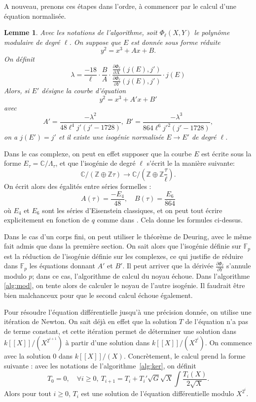 \documentclass[11pt,a4paper]{article}
\newcommand{\Z}{\mathbb{Z}}
\newcommand{\C}{\mathbb{C}}
\newcommand{\F}{\mathbb{F}}
\newcommand{\vers}{\longrightarrow}
\renewcommand{\v}{\vspace{5mm}}
\newtheorem*{lem}{Lemme}
\theoremstyle{definition}
\begin{document}
A nouveau, prenons ces étapes dans l'ordre, à commencer par le calcul d'une équation normalisée.

\begin{lem}
Avec les notations de l'algorithme, soit $\Phi_ \ell(X, Y)$ le polynôme modulaire de degré $\ell$. On suppose que $E$ est donnée sous forme réduite
$$y^2 = x^3 + A x + B.$$
On définit
$$\lambda = \frac{-18}{\ell}\cdot\frac{B}{A}\cdot\frac{\frac{\partial \Phi_\ell}{\partial X} (j(E), j')}{\frac{\partial \Phi_\ell}{\partial Y} (j(E), j')} \cdot j(E) $$
Alors, si $E'$ désigne la courbe d'équation
$$y^2 = x^3 + A' x + B' $$
avec
$$A' = \frac{-\lambda^2}{48 \ell^4 j' (j' - 1728)},\ B' = \frac{-\lambda^3}{864 \ell^6 j'^2(j'-1728)},$$
on a $j(E') = j'$ et il existe une isogénie normalisée $E\vers E'$ de degré $\ell$.
\end{lem}

Dans le cas complexe, on peut en effet supposer que la courbe $E$ est écrite sous la forme $E_\tau = \C/\Lambda_\tau$, et que l'isogénie de degré $\ell$ s'écrit le la manière suivante:
$$\C/(\Z\oplus \Z\tau) \vers \C/(\Z \oplus \Z\frac{\tau}{\ell}).$$
 On écrit alors des égalités entre séries formelles :
$$A(\tau) = \frac{- E_4}{48}, \quad B(\tau) = \frac{E_6}{864}$$
où $E_4$ et $E_6$ sont les séries d'Eisenstein classiques, et on peut tout écrire explicitement en fonction de $q$ comme dans \cite{Schoof}. Cela donne les formules ci-dessus.

Dans le cas d'un corps fini, on peut utiliser le théorème de Deuring, avec le même fait admis que dans la première section. On sait alors que l'isogénie définie sur $\F_p$ est la réduction de l'isogénie définie sur les complexes, ce qui justifie de réduire dans $\F_p$ les équations donnant $A'$ et $B'$. Il peut arriver que la dérivée $\frac{\partial \Phi_\ell}{\partial Y}$ s'annule modulo $p$; dans ce cas, l'algorithme de calcul du noyau échoue. Dans l'algorithme \ref{alg:mod}, on tente alors de calculer le noyau de l'autre isogénie. Il faudrait être bien malchanceux pour que le second calcul échoue également.

\v

Pour résoudre l'équation différentielle jusqu'à une précision donnée, on utilise une itération de Newton. On sait déjà en effet que la solution $T$ de l'équation n'a pas de terme constant, et cette itération permet de déterminer une solution dans $k[[X]]/(X^{2^{i+1}})$ à partir d'une solution dans $k[[X]]/(X^{2^i})$. On commence avec la solution $0$ dans $k[[X]]/(X)$. Concrètement, le calcul prend la forme suivante : avec les notations de l'algorithme~\ref{alg:ker}, on définit
$$T_0 = 0, \quad \forall i\geq 0,\ T_{i+1} = T_i + T_i' \sqrt{G} \sqrt{X} \int \frac{T_i(X)}{2\sqrt{X}}.$$
Alors pour tout $i\geq 0$, $T_i$ est une solution de l'équation différentielle modulo $X^{2^i}$.
\end{document}
